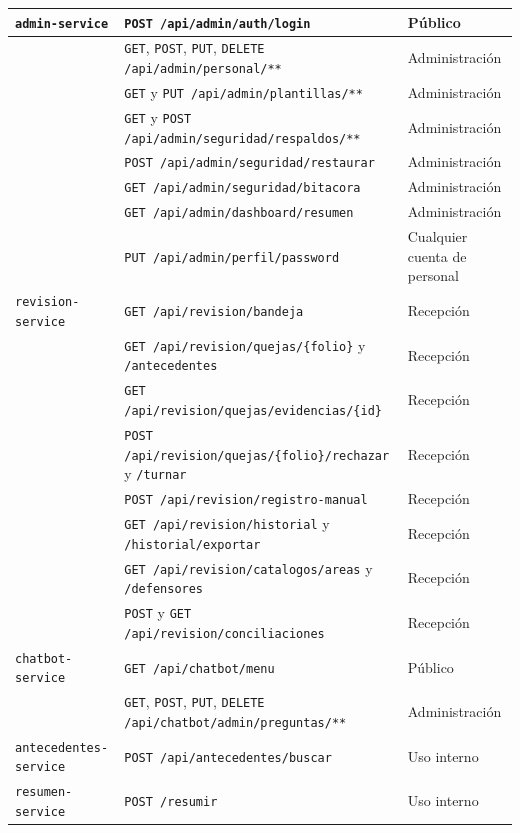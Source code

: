 \begin{longtable}{|p{2.6cm}|p{8.6cm}|p{3.0cm}|}
	\texttt{admin-service} & \texttt{POST /api/admin/auth/login} & Público \\ \hline
	& \texttt{GET}, \texttt{POST}, \texttt{PUT}, \texttt{DELETE /api/admin/personal/**} &
	Administración \\ \hline
	& \texttt{GET} y \texttt{PUT /api/admin/plantillas/**} & Administración \\ \hline
	& \texttt{GET} y \texttt{POST /api/admin/\allowbreak seguridad/respaldos/**} & Administración \\ \hline
	& \texttt{POST /api/admin/seguridad/restaurar} & Administración \\ \hline
	& \texttt{GET /api/admin/seguridad/bitacora} & Administración \\ \hline
	& \texttt{GET /api/admin/dashboard/resumen} & Administración \\ \hline
	& \texttt{PUT /api/admin/perfil/password} & Cualquier cuenta de personal \\ \hline

	\texttt{revision-\allowbreak service} & \texttt{GET /api/revision/bandeja} & Recepción \\ \hline
	& \texttt{GET /api/revision/quejas/\{folio\}} y \texttt{/antecedentes} & Recepción \\ \hline
	& \texttt{GET /api/revision/\allowbreak quejas/evidencias/\{id\}} & Recepción \\ \hline
	& \texttt{POST /api/revision/\allowbreak quejas/\{folio\}/rechazar} y \texttt{/turnar} & Recepción
	\\ \hline
	& \texttt{POST /api/revision/registro-manual} & Recepción \\ \hline
	& \texttt{GET /api/revision/historial} y \texttt{/historial/exportar} & Recepción \\ \hline
	& \texttt{GET /api/revision/catalogos/areas} y \texttt{/defensores} & Recepción \\ \hline
	& \texttt{POST} y \texttt{GET /api/revision/conciliaciones} & Recepción \\ \hline

	\texttt{chatbot-\allowbreak service} & \texttt{GET /api/chatbot/menu} & Público \\ \hline
	& \texttt{GET}, \texttt{POST}, \texttt{PUT}, \texttt{DELETE /api/chatbot/\allowbreak admin/preguntas/**} &
	Administración \\ \hline
	\texttt{antecedentes-service} & \texttt{POST /api/antecedentes/buscar} & Uso interno \\ \hline
	\texttt{resumen-service} & \texttt{POST /resumir} & Uso interno \\ \hline
\end{longtable}

